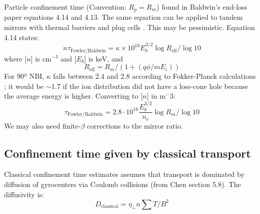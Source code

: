 Particle confinement time (Convention: $R_p = R_m$) found in Baldwin's end-loss paper \cite{baldwin_end-loss_1977} equations 4.14 and 4.13. The same equation can be applied to tandem mirrors with thermal barriers and plug cells \cite{PhysRevLett.43.1318}. This may be pessimistic. %
Equation 4.14 \cite{baldwin_end-loss_1977} states:
\begin{equation}
     n\tau_{\text{Fowler/Baldwin}} = \kappa \times 10^{10} {E_b^{3/2}} \log{R_{\text{eff}}} / \log{10}
\end{equation}
where [$n$] is cm$^{-3}$ and [$E_b$] is keV, and
\begin{equation}
    R_{\text{eff}} = R_m / \left( 1 + (q \phi / m E_i) \right)
\end{equation}
For $90$º NBI, $\kappa$ falls between 2.4 and 2.8 according to Fokker-Planck calculations \cite{baldwin_end-loss_1977}; it would be $\sim$1.7 if the ion distribution did not have a loss-cone hole because the average energy is higher. 
Converting to [$n$] in m${^-3}$:
\begin{equation}
    \tau_{\text{Fowler/Baldwin}} = 2.8 \cdot 10^{16} \frac{E_b^{3/2}}{n_e} \log R_m / \log{10}
\end{equation}
We may also need finite-$\beta$ corrections to the mirror ratio.

\subsection{Confinement time given by classical transport}
Classical confinement time estimates assumes that transport is dominated by diffusion of gyrocenters via Coulomb collisions (from Chen section 5.8\cite{Chen_3rd_ed}). The diffusivity is:
\begin{equation}
    D_\text{classical} = \eta_\perp n \sum T / B^2
\end{equation}

